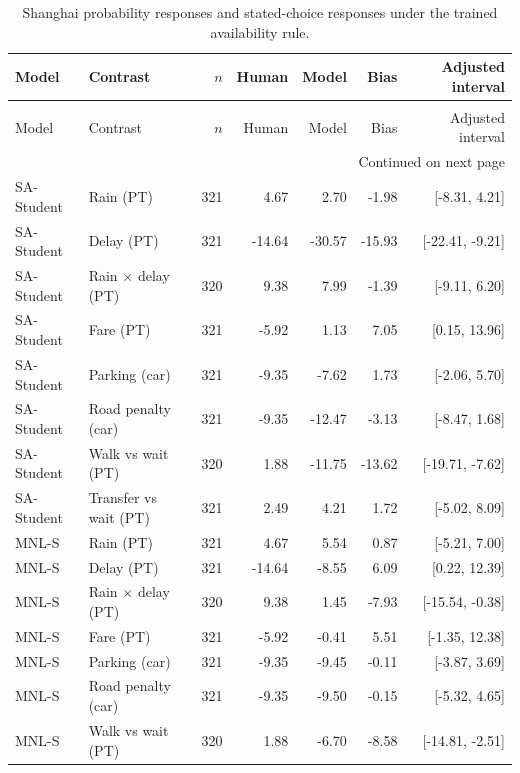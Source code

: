 \begingroup\footnotesize\setlength{\tabcolsep}{3pt}\renewcommand{\arraystretch}{1.12}
\begin{longtable}{@{\extracolsep{\fill}}llrrrrr@{}}
\caption{Shanghai probability responses and stated-choice responses under the trained availability rule.}\label{tab:responses_shanghai_0}\\
\toprule
Model & Contrast & $n$ & Human & Model & Bias & Adjusted interval \\
\midrule
\label{tab:responses_shanghai_1}\endfirsthead
\multicolumn{7}{l}{\small\itshape Shanghai response comparison (continued)}\\
\toprule
Model & Contrast & $n$ & Human & Model & Bias & Adjusted interval \\
\midrule
\endhead
\midrule\multicolumn{7}{r}{\footnotesize Continued on next page}\\\endfoot
\bottomrule\endlastfoot
SA-Student & Rain (PT) & 321 & 4.67 & 2.70 & -1.98 & [-8.31, 4.21] \\
SA-Student & Delay (PT) & 321 & -14.64 & -30.57 & -15.93 & [-22.41, -9.21] \\
SA-Student & Rain $\times$ delay (PT) & 320 & 9.38 & 7.99 & -1.39 & [-9.11, 6.20] \\
SA-Student & Fare (PT) & 321 & -5.92 & 1.13 & 7.05 & [0.15, 13.96] \\
SA-Student & Parking (car) & 321 & -9.35 & -7.62 & 1.73 & [-2.06, 5.70] \\
SA-Student & Road penalty (car) & 321 & -9.35 & -12.47 & -3.13 & [-8.47, 1.68] \\
SA-Student & Walk vs wait (PT) & 320 & 1.88 & -11.75 & -13.62 & [-19.71, -7.62] \\
SA-Student & Transfer vs wait (PT) & 321 & 2.49 & 4.21 & 1.72 & [-5.02, 8.09] \\
MNL-S & Rain (PT) & 321 & 4.67 & 5.54 & 0.87 & [-5.21, 7.00] \\
MNL-S & Delay (PT) & 321 & -14.64 & -8.55 & 6.09 & [0.22, 12.39] \\
MNL-S & Rain $\times$ delay (PT) & 320 & 9.38 & 1.45 & -7.93 & [-15.54, -0.38] \\
MNL-S & Fare (PT) & 321 & -5.92 & -0.41 & 5.51 & [-1.35, 12.38] \\
MNL-S & Parking (car) & 321 & -9.35 & -9.45 & -0.11 & [-3.87, 3.69] \\
MNL-S & Road penalty (car) & 321 & -9.35 & -9.50 & -0.15 & [-5.32, 4.65] \\
MNL-S & Walk vs wait (PT) & 320 & 1.88 & -6.70 & -8.58 & [-14.81, -2.51] \\

\end{longtable}

